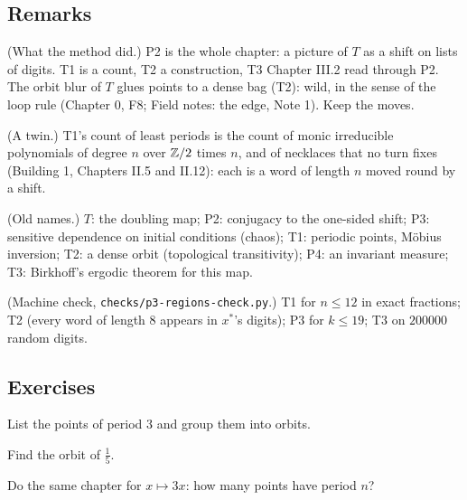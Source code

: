 \subsection*{Remarks}

\begin{lines}
\item[\lab{R1}] (What the method did.) P2 is the whole chapter: a picture of $T$ as a shift on lists of digits. T1 is a count, T2 a construction, T3 Chapter III.2 read through P2. The orbit blur of $T$ glues points to a dense bag (T2): wild, in the sense of the loop rule (Chapter 0, F8; Field notes: the edge, Note 1). Keep the moves.
\item[\lab{R2}] (A twin.) T1's count of least periods is the count of monic irreducible polynomials of degree $n$ over $\mathbb{Z}/2$ times $n$, and of necklaces that no turn fixes (Building 1, Chapters II.5 and II.12): each is a word of length $n$ moved round by a shift.
\item[\lab{R3}] (Old names.) $T$: the doubling map; P2: conjugacy to the one-sided shift; P3: sensitive dependence on initial conditions (chaos); T1: periodic points, Möbius inversion; T2: a dense orbit (topological transitivity); P4: an invariant measure; T3: Birkhoff's ergodic theorem for this map.
\item[\lab{R4}] (Machine check, \texttt{checks/p3-regions-check.py}.) T1 for $n \le 12$ in exact fractions; T2 (every word of length $8$ appears in $x^*$'s digits); P3 for $k \le 19$; T3 on $200000$ random digits.
\end{lines}

\subsection*{Exercises}

\begin{lines}
\item[\lab{E1}] List the points of period $3$ and group them into orbits.
\item[\lab{E2}] Find the orbit of $\tfrac15$.
\item[\lab{E3}] Do the same chapter for $x \mapsto 3x$: how many points have period $n$?
\end{lines}
